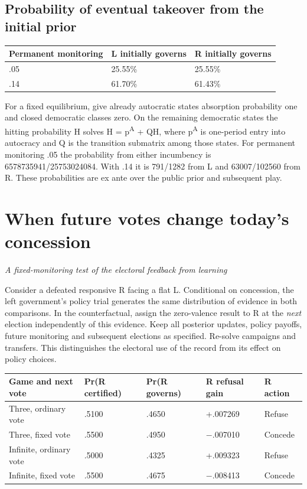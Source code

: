 \documentclass[11pt]{article}
\begin{document}
\subsection*{Probability of eventual takeover from the initial prior}

\begin{center}\small\begin{tabular}{lll}\toprule
\textbf{Permanent monitoring} & \textbf{L initially governs} & \textbf{R initially governs}\\ \midrule
.05 & 25.55\% & 25.55\%\\
.14 & 61.70\% & 61.43\%\\
\bottomrule\end{tabular}\end{center}

For a fixed equilibrium, give already autocratic states absorption probability one and closed democratic classes zero. On the remaining democratic states the hitting probability H solves H = p\textsuperscript{A} + QH, where p\textsuperscript{A} is one-period entry into autocracy and Q is the transition submatrix among those states. For permanent monitoring .05 the probability from either incumbency is 6578735941/25753024084. With .14 it is 791/1282 from L and 63007/102560 from R. These probabilities are ex ante over the public prior and subsequent play.

\section*{When future votes change today's concession}
\emph{A fixed-monitoring test of the electoral feedback from learning}

Consider a defeated responsive R facing a flat L. Conditional on concession, the left government's policy trial generates the same distribution of evidence in both comparisons. In the counterfactual, assign the zero-valence result to R at the \emph{next} election independently of this evidence. Keep all posterior updates, policy payoffs, future monitoring and subsequent elections as specified. Re-solve campaigns and transfers. This distinguishes the electoral use of the record from its effect on policy choices.

\begin{center}\small\begin{tabular}{lllll}\toprule
\textbf{Game and next vote} & \textbf{Pr(R certified)} & \textbf{Pr(R governs)} & \textbf{R refusal gain} & \textbf{R action}\\ \midrule
Three, ordinary vote & .5100 & .4650 & +.007269 & Refuse\\
Three, fixed vote & .5500 & .4950 & $-$.007010 & Concede\\
Infinite, ordinary vote & .5000 & .4325 & +.009323 & Refuse\\
Infinite, fixed vote & .5500 & .4675 & $-$.008413 & Concede\\
\bottomrule\end{tabular}\end{center}
\end{document}
